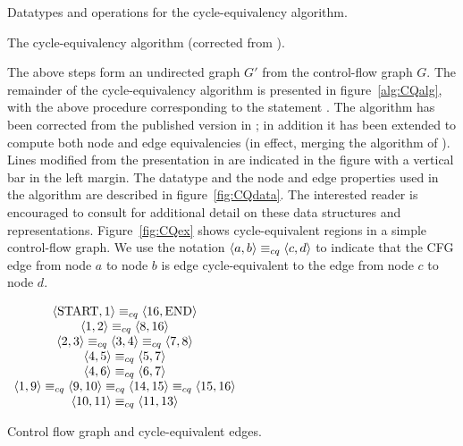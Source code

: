 \documentclass[12pt,titlepage,twoside]{article}
\begin{document}
\begin{myfigure}\small
\caption{Datatypes and operations for the cycle-equivalency algorithm.}
\label{fig:CQdata}\end{myfigure}

\begin{myalgorithm}\small\linespread{0.75}
\caption{The cycle-equivalency algorithm
	 (corrected from \cite{johnson93:sese}).}
\label{alg:CQalg}\end{myalgorithm}

The above steps form an undirected graph $G'$ from the control-flow
graph $G$.  The remainder of the cycle-equivalency algorithm is
presented in figure~\vref{alg:CQalg}, with the above procedure
corresponding to the statement .  The
algorithm has been corrected from the published version in
\cite{johnson93:sese}; in addition it has been extended to compute
both node and edge equivalencies (in effect, merging the algorithm of
\cite{johnson94:pst}).  Lines modified from the presentation in
\cite{johnson93:sese} are indicated in the figure with a vertical bar
in the left margin.  The datatype  and the node
and edge properties used in the algorithm are described in
figure~\vref{fig:CQdata}.  The interested reader is encouraged to consult
\cite{johnson93:sese} for additional detail on these data structures
and representations.%
Figure~\vref{fig:CQex} shows cycle-equivalent regions in a simple
control-flow graph.  We use the notation
$\left\langle a,b \right\rangle\equiv_{cq}\left\langle c,d \right\rangle$ to indicate that the CFG edge from node
$a$ to node $b$ is edge cycle-equivalent to the edge from node $c$ to
node $d$.

\begin{myfigure}\centering
\vertcenter{}
$\begin{array}[c]{cc}
\left\langle \text{START},1 \right\rangle\equiv_{cq}\left\langle 16,\text{END} \right\rangle\\
\left\langle 1,2 \right\rangle\equiv_{cq}\left\langle 8,16 \right\rangle\\
\left\langle 2,3 \right\rangle\equiv_{cq}\left\langle 3,4 \right\rangle\equiv_{cq}\left\langle 7,8 \right\rangle\\
\left\langle 4,5 \right\rangle\equiv_{cq}\left\langle 5,7 \right\rangle\\
\left\langle 4,6 \right\rangle\equiv_{cq}\left\langle 6,7 \right\rangle\\
\left\langle 1,9 \right\rangle\equiv_{cq}\left\langle 9,10 \right\rangle\equiv_{cq}\left\langle 14,15 \right\rangle\equiv_{cq}\left\langle 15,16 \right\rangle\\
\left\langle 10,11 \right\rangle\equiv_{cq}\left\langle 11,13 \right\rangle\\
\end{array}$
\caption{Control flow graph and cycle-equivalent edges.}
\label{fig:CQex}\end{myfigure}
\end{document}
